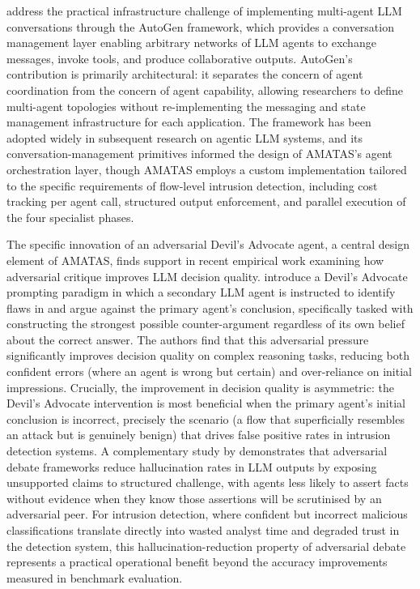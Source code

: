 \textcite{Wu2023} address the practical infrastructure challenge of implementing multi-agent LLM conversations through the AutoGen framework, which provides a conversation management layer enabling arbitrary networks of LLM agents to exchange messages, invoke tools, and produce collaborative outputs. AutoGen's contribution is primarily architectural: it separates the concern of agent coordination from the concern of agent capability, allowing researchers to define multi-agent topologies without re-implementing the messaging and state management infrastructure for each application. The framework has been adopted widely in subsequent research on agentic LLM systems, and its conversation-management primitives informed the design of AMATAS's agent orchestration layer, though AMATAS employs a custom implementation tailored to the specific requirements of flow-level intrusion detection, including cost tracking per agent call, structured output enforcement, and parallel execution of the four specialist phases.

The specific innovation of an adversarial Devil's Advocate agent, a central design element of AMATAS, finds support in recent empirical work examining how adversarial critique improves LLM decision quality. \textcite{Yin2024} introduce a Devil's Advocate prompting paradigm in which a secondary LLM agent is instructed to identify flaws in and argue against the primary agent's conclusion, specifically tasked with constructing the strongest possible counter-argument regardless of its own belief about the correct answer. The authors find that this adversarial pressure significantly improves decision quality on complex reasoning tasks, reducing both confident errors (where an agent is wrong but certain) and over-reliance on initial impressions. Crucially, the improvement in decision quality is asymmetric: the Devil's Advocate intervention is most beneficial when the primary agent's initial conclusion is incorrect, precisely the scenario (a flow that superficially resembles an attack but is genuinely benign) that drives false positive rates in intrusion detection systems. A complementary study by \textcite{Yang2025} demonstrates that adversarial debate frameworks reduce hallucination rates in LLM outputs by exposing unsupported claims to structured challenge, with agents less likely to assert facts without evidence when they know those assertions will be scrutinised by an adversarial peer. For intrusion detection, where confident but incorrect malicious classifications translate directly into wasted analyst time and degraded trust in the detection system, this hallucination-reduction property of adversarial debate represents a practical operational benefit beyond the accuracy improvements measured in benchmark evaluation.

